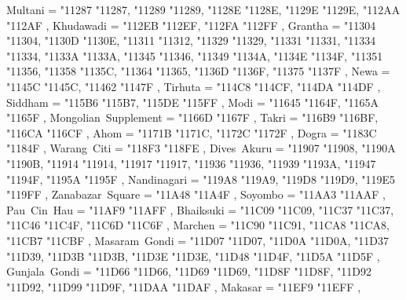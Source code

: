 {    Multani                                        = { {"11287} {"11287}, {"11289} {"11289}, {"1128E} {"1128E}, {"1129E} {"1129E}, {"112AA} {"112AF} },
    Khudawadi                                      = { {"112EB} {"112EF}, {"112FA} {"112FF} },
    Grantha                                        = { {"11304} {"11304}, {"1130D} {"1130E}, {"11311} {"11312}, {"11329} {"11329}, {"11331} {"11331}, {"11334} {"11334}, {"1133A} {"1133A}, {"11345} {"11346}, {"11349} {"1134A}, {"1134E} {"1134F}, {"11351} {"11356}, {"11358} {"1135C}, {"11364} {"11365}, {"1136D} {"1136F}, {"11375} {"1137F} },
    Newa                                           = { {"1145C} {"1145C}, {"11462} {"1147F} },
    Tirhuta                                        = { {"114C8} {"114CF}, {"114DA} {"114DF} },
    Siddham                                        = { {"115B6} {"115B7}, {"115DE} {"115FF} },
    Modi                                           = { {"11645} {"1164F}, {"1165A} {"1165F} },
    Mongolian~Supplement                           = { {"1166D} {"1167F} },
    Takri                                          = { {"116B9} {"116BF}, {"116CA} {"116CF} },
    Ahom                                           = { {"1171B} {"1171C}, {"1172C} {"1172F} },
    Dogra                                          = { {"1183C} {"1184F} },
    Warang~Citi                                    = { {"118F3} {"118FE} },
    Dives~Akuru                                    = { {"11907} {"11908}, {"1190A} {"1190B}, {"11914} {"11914}, {"11917} {"11917}, {"11936} {"11936}, {"11939} {"1193A}, {"11947} {"1194F}, {"1195A} {"1195F} },
    Nandinagari                                    = { {"119A8} {"119A9}, {"119D8} {"119D9}, {"119E5} {"119FF} },
    Zanabazar~Square                               = { {"11A48} {"11A4F} },
    Soyombo                                        = { {"11AA3} {"11AAF} },
    Pau~Cin~Hau                                    = { {"11AF9} {"11AFF} },
    Bhaiksuki                                      = { {"11C09} {"11C09}, {"11C37} {"11C37}, {"11C46} {"11C4F}, {"11C6D} {"11C6F} },
    Marchen                                        = { {"11C90} {"11C91}, {"11CA8} {"11CA8}, {"11CB7} {"11CBF} },
    Masaram~Gondi                                  = { {"11D07} {"11D07}, {"11D0A} {"11D0A}, {"11D37} {"11D39}, {"11D3B} {"11D3B}, {"11D3E} {"11D3E}, {"11D48} {"11D4F}, {"11D5A} {"11D5F} },
    Gunjala~Gondi                                  = { {"11D66} {"11D66}, {"11D69} {"11D69}, {"11D8F} {"11D8F}, {"11D92} {"11D92}, {"11D99} {"11D9F}, {"11DAA} {"11DAF} },
    Makasar                                        = { {"11EF9} {"11EFF} },
}
